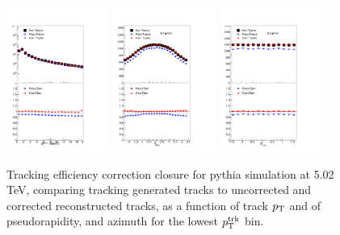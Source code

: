  \begin{figure}[h!]
    \begin{center}
       \includegraphics[width=0.3\textwidth]{figures/Detector/TrackingEfficiencyPtPythia.pdf}
             \includegraphics[width=0.3\textwidth]{figures/Detector/TrackingEfficiencyEtaPythia_TrkPt0p7TrkPt1.pdf}	
                    \includegraphics[width=0.3\textwidth]{figures/Detector/TrackingEfficiencyPhiPythia_TrkPt0p7TrkPt1.pdf}	
         \caption[Tracking efficiency correction example]{Tracking efficiency correction closure for {\sc pythia} simulation at 5.02 TeV, comparing tracking generated tracks to uncorrected and corrected reconstructed tracks, as a function of track $p_{\rm T}$ and of pseudorapidity, and azimuth for the lowest $p_{\rm T}^{\rm trk}$ bin.}
       \label{fig:trk_eff_pythia}
    \end{center}
 \end{figure}
 
 



